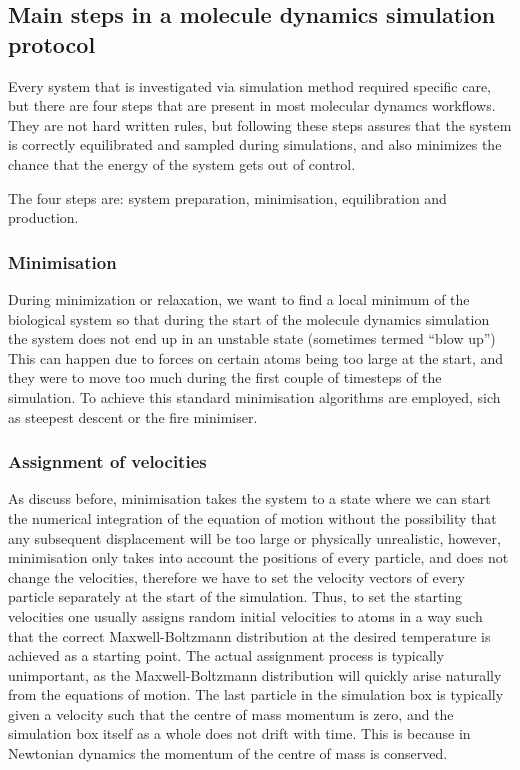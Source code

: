 \subsection{Main steps in a molecule dynamics simulation protocol}

Every system that is investigated via simulation method required specific care, but there are four steps that are present in most molecular dynamcs workflows. They are not hard written rules, but following these steps assures that the system is correctly equilibrated and sampled during simulations, and also minimizes the chance that the energy of the system gets out of control.

The four steps are: system preparation, minimisation, equilibration and production.

\subsubsection{Minimisation}

During minimization or relaxation, we want to find a local minimum of the biological system so that during the start of the molecule dynamics simulation the system does not end up in an unstable state (sometimes termed ``blow up'') This can happen due to forces on certain atoms being too large at the start, and they were to move too much during the first couple of timesteps of the simulation. To achieve this standard minimisation algorithms are employed, sich as steepest descent or the fire minimiser. 

\subsubsection{Assignment of velocities}

As discuss before, minimisation takes the system to a state where we can start the numerical integration of the equation of motion without the possibility that any subsequent displacement will be too large or physically unrealistic,  however, minimisation only takes into account the positions of every particle, and does not change the velocities, therefore we have to set the velocity vectors of every particle separately at the start of the simulation. Thus, to set the starting velocities one usually assigns random initial velocities to atoms in a way such that the correct Maxwell-Boltzmann distribution at the desired temperature is achieved as a starting point. The actual assignment process is typically unimportant, as the Maxwell-Boltzmann distribution will quickly arise naturally from the equations of motion. The last particle in the simulation box is typically given a velocity such that the centre of mass momentum is zero, and the simulation box itself as a whole does not drift with time. This is because in Newtonian dynamics the momentum of the centre of mass is conserved. 

